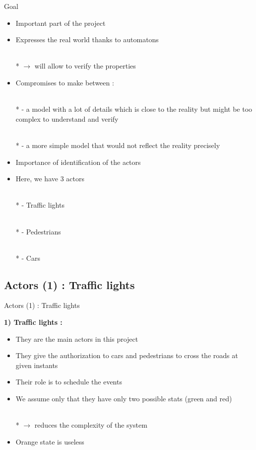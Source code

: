 \documentclass{bredelebeamer}
\begin{document}
\begin{frame}{Goal}


\begin{itemize}

\item Important part of the project

\item Expresses the real world thanks to automatons

\\* $\longrightarrow$ will allow to verify the properties

\item Compromises to make between :

\\* - a model with a lot of details which is close to the reality but might be too complex to understand and verify

\\* - a more simple model that would not reflect the reality precisely

\item Importance of identification of the actors

\item Here, we have 3 actors

\\* - Traffic lights

\\* - Pedestrians

\\* - Cars

\end{itemize}


\end{frame}


\subsection{Actors (1) : Traffic lights}

\begin{frame}{Actors (1) : Traffic lights }


\textbf{1) Traffic lights : }


\begin{itemize}

\item They are the main actors in this project

\item They give the authorization to cars and pedestrians to cross the roads at given instants

\item Their role is to schedule the events

\item We assume only that they have only two possible stats (green and red)

\\* $\longrightarrow$ reduces the complexity of the system

\item Orange state is useless

\end{itemize}


\end{frame}
\end{document}
